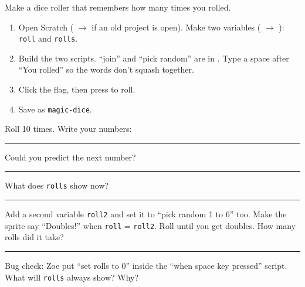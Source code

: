 \namedateline

\begin{core}
Make a dice roller that remembers how many times you rolled.
\begin{enumerate}[leftmargin=1.4em,itemsep=1pt]
  \item Open Scratch ( $\rightarrow$  if an old project is open). Make two variables ( $\rightarrow$ ): \texttt{roll} and \texttt{rolls}.
  \item Build the two scripts. \enquote{join} and \enquote{pick random} are in . Type a space after \enquote{You rolled} so the words don't squash together.
  \item Click the flag, then press  to roll.
  \item Save as \texttt{magic-dice}.
\end{enumerate}
\begin{center}
\begin{scratch}[scale=0.78]
\end{scratch}
\hspace{0.5cm}
\begin{scratch}[scale=0.78]
\end{scratch}
\end{center}
Roll 10 times. Write your numbers: \rule{8cm}{0.4pt}

Could you predict the next number? \rule{4cm}{0.4pt}\quad What does \texttt{rolls} show now? \rule{2cm}{0.4pt}
\end{core}

\begin{challenge}[Doubles!]
Add a second variable \texttt{roll2} and set it to \enquote{pick random 1 to 6} too. Make the sprite say \enquote{Doubles!} when \texttt{roll} = \texttt{roll2}. Roll until you get doubles. How many rolls did it take? \rule{2cm}{0.4pt}

Bug check: Zoe put \enquote{set rolls to 0} inside the \enquote{when space key pressed} script. What will \texttt{rolls} always show? Why? 
\end{challenge}

